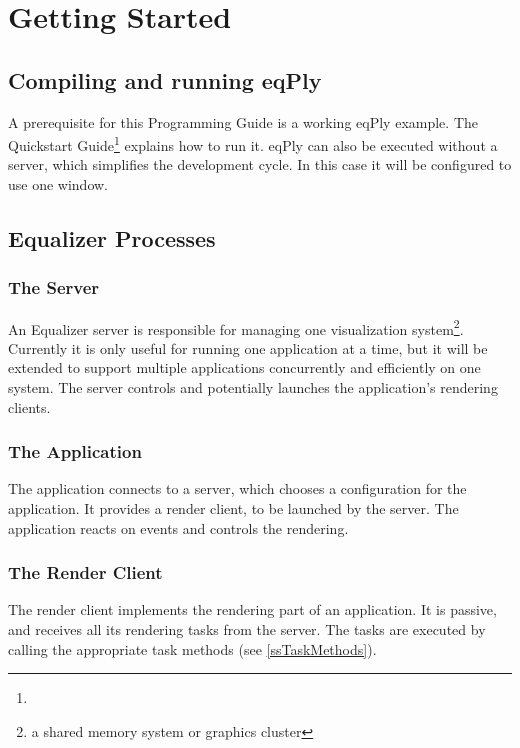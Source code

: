 \documentclass[10pt,a4]{scrartcl}
\begin{document}
\section{Getting Started}

\subsection{Compiling and running \textsf{eqPly}}

A prerequisite for this Programming Guide is a working \textsf{eqPly}
example. The Quickstart
Guide\footnote{}
explains how to run it. \textsf{eqPly} can also be executed without a
server, which simplifies the development cycle. In this case it will be
configured to use one window.

\subsection{Equalizer Processes}

\subsubsection{The Server}

An Equalizer server is responsible for managing one visualization
system\footnote{a shared memory system or graphics cluster}. Currently
it is only useful for running one application at a time, but it will be
extended to support multiple applications concurrently and efficiently
on one system. The server controls and potentially launches the
application's rendering clients.

\subsubsection{The Application}

The application connects to a server, which chooses a configuration for
the application. It provides a render client, to be launched by the
server. The application reacts on events and controls the rendering.

\subsubsection{The Render Client}

The render client implements the rendering part of an application. It is
passive, and receives all its rendering tasks from the server. The tasks
are executed by calling the appropriate task methods (see
\ref{ssTaskMethods}).
\end{document}
